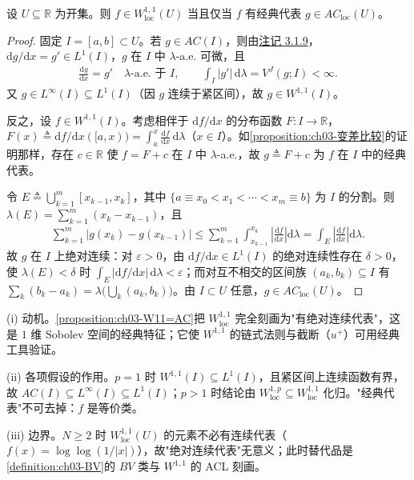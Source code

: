 \documentclass[../../main.tex]{subfiles}%
\begin{document}
\begin{proposition}\label{proposition:ch03-W11=AC}\label{proposition:ch03-Sobolev刻画}
设 $U\subseteq\mathbb{R}$ 为开集。则 $f\in W^{1,1}_{\mathrm{loc}}(U)$ 当且仅当 $f$ 有经典代表 $g\in AC_{\mathrm{loc}}(U)$。
\end{proposition}

\begin{proof}
固定 $I=[a,b]\subset U$。若 $g\in AC(I)$，则由\hyperref[remark:ch03-AC蕴含]{注记 3.1.9}，$\mathrm{d}g/\mathrm{d}x=g'\in L^1(I)$，$g$ 在 $I$ 中 $\lambda$-a.e. 可微，且
\begin{align*}
\frac{\mathrm{d}g}{\mathrm{d}x}=g'\quad\lambda\text{-a.e. 于 }I,\qquad \int_I|g'|\,\mathrm{d}\lambda=V^J(g;I)<\infty.
\end{align*}
又 $g\in L^\infty(I)\subseteq L^1(I)$（因 $g$ 连续于紧区间），故 $g\in W^{1,1}(I)$。

反之，设 $f\in W^{1,1}(I)$。考虑相伴于 $\mathrm{d}f/\mathrm{d}x$ 的分布函数 $F:I\to\mathbb{R}$，$F(x)\triangleq\mathrm{d}f/\mathrm{d}x([a,x))=\int_a^x\frac{\mathrm{d}f}{\mathrm{d}x}\,\mathrm{d}\lambda$（$x\in I$）。如\cref{proposition:ch03-变差比较}的证明那样，存在 $c\in\mathbb{R}$ 使 $f=F+c$ 在 $I$ 中 $\lambda$-a.e.，故 $g\triangleq F+c$ 为 $f$ 在 $I$ 中的经典代表。

令 $E\triangleq\bigcup_{k=1}^m[x_{k-1},x_k]$，其中 $\{a\equiv x_0<x_1<\cdots<x_m\equiv b\}$ 为 $I$ 的分割。则 $\lambda(E)=\sum_{k=1}^m(x_k-x_{k-1})$，且
\begin{align*}
\sum_{k=1}^m|g(x_k)-g(x_{k-1})|\leqslant\sum_{k=1}^m\int_{x_{k-1}}^{x_k}\left|\frac{\mathrm{d}f}{\mathrm{d}x}\right|\mathrm{d}\lambda=\int_E\left|\frac{\mathrm{d}f}{\mathrm{d}x}\right|\mathrm{d}\lambda.
\end{align*}
故 $g$ 在 $I$ 上绝对连续：对 $\varepsilon>0$，由 $\mathrm{d}f/\mathrm{d}x\in L^1(I)$ 的绝对连续性存在 $\delta>0$，使 $\lambda(E)<\delta$ 时 $\int_E|\mathrm{d}f/\mathrm{d}x|\,\mathrm{d}\lambda<\varepsilon$；而对互不相交的区间族 $(a_k,b_k)\subseteq I$ 有 $\sum_k(b_k-a_k)=\lambda\big(\bigcup_k(a_k,b_k)\big)$。由 $I\subset U$ 任意，$g\in AC_{\mathrm{loc}}(U)$。
\end{proof}

\begin{remark}\label{remark:ch03-W11=AC动机}
(i) 动机。\cref{proposition:ch03-W11=AC}把 $W^{1,1}_{\mathrm{loc}}$ 完全刻画为"有绝对连续代表"，这是 $1$ 维 Sobolev 空间的经典特征；它使 $W^{1,1}$ 的链式法则与截断（$u^+$）可用经典工具验证。

(ii) 各项假设的作用。$p=1$ 时 $W^{1,1}(I)\subseteq L^1(I)$，且紧区间上连续函数有界，故 $AC(I)\subseteq L^\infty(I)\subseteq L^1(I)$；$p>1$ 时结论由 $W^{1,p}_{\mathrm{loc}}\subseteq W^{1,1}_{\mathrm{loc}}$ 化归。"经典代表"不可去掉：$f$ 是等价类。

(iii) 边界。$N\geqslant2$ 时 $W^{1,1}_{\mathrm{loc}}(U)$ 的元素不必有连续代表（$f(x)=\log\log(1/|x|)$），故"绝对连续代表"无意义；此时替代品是\cref{definition:ch03-BV}的 $BV$ 类与 $W^{1,1}$ 的 ACL 刻画。
\end{remark}
\end{document}
